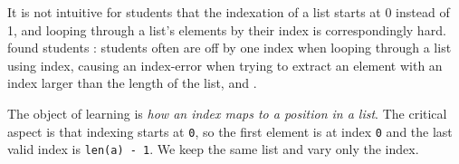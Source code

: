  It is not intuitive for students that the indexation of a list starts at
0 instead of 1, and looping through a list's elements by their index is
correspondingly hard. \textcite{KumarVeerasamy2016} found students
: students often are off by one index when looping through a list
using index, causing an index-error when trying to extract an element
with an index larger than the length of the list, and
.

The object of learning is \emph{how an index maps to a position in a list}. The
critical aspect is that indexing starts at \texttt{0}, so the first
element is at index \texttt{0} and the last valid index is
\texttt{len(a) - 1}. We keep the same list and vary only the index.

